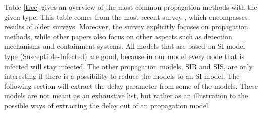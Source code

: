 Table \ref{tree} gives an overview of the most common propagation methods with the given type. This table comes from the most recent survey \citep{wang2014modeling}, which encompasses results of older surveys. Moreover, the survey explicitly focuses on propagation methods, while other papers also focus on other aspects such as  detection mechanisms and containment systems. All models that are based on SI model type (Susceptible-Infected) are good, because in our model every node that is infected will stay infected. The other propagation models, SIR and SIS, are only interesting if there is a possibility to reduce the models to an SI model. The following section will extract the delay parameter from some of the models. These models are not meant as an exhaustive list, but rather as an illustration to the possible ways of extracting the delay out of an propagation model. 










